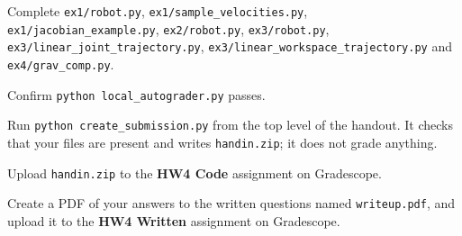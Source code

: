 \documentclass{16384_doc}
\begin{document}
\begin{submissionChecklist}
    \item Complete \verb!ex1/robot.py!, \verb!ex1/sample_velocities.py!,
        \verb!ex1/jacobian_example.py!, \verb!ex2/robot.py!, \verb!ex3/robot.py!,
        \verb!ex3/linear_joint_trajectory.py!,
        \verb!ex3/linear_workspace_trajectory.py! and \verb!ex4/grav_comp.py!.
    \item Confirm \verb!python local_autograder.py! passes.
    \item Run \verb!python create_submission.py! from the top level of the
        handout. It checks that your files are present and writes
        \verb!handin.zip!; it does not grade anything.
    \item Upload \verb!handin.zip! to the \textbf{HW4 Code} assignment on
        Gradescope.
    \item Create a PDF of your answers to the written questions named
        \verb!writeup.pdf!, and upload it to the \textbf{HW4 Written} assignment
        on Gradescope.
\end{submissionChecklist}
\end{document}
